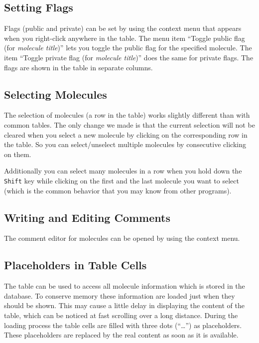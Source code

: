 \subsection{Setting Flags}

Flags (public and private) can be set by using the context menu that
appears when you right-click anywhere in the table. The menu item ``Toggle
public flag (for \textit{molecule title})'' lets you toggle the public
flag for the specified molecule. The item ``Toggle private flag
(for \textit{molecule title})'' does the same for private flags. The
flags are shown in the table in separate columns.


\subsection{Selecting Molecules}

The selection of molecules (a row in the table) works slightly different
than with common tables. The only change we made is that the current
selection will not be cleared when you select a new molecule by clicking
on the corresponding row in the table. So you can select/unselect
multiple molecules by consecutive clicking on them.

Additionally you can select many molecules in a row when you hold
down the \texttt{Shift} key while clicking on the first and the last
molecule you want to select (which is the common behavior that you
may know from other programs).


\subsection{Writing and Editing Comments}

The comment editor for molecules can be opened by using the context menu. 


\subsection{Placeholders in Table Cells}

The table can be used to access all molecule information which is
stored in the database. To conserve memory these information are loaded
just when they should be shown. This may cause a little delay in
displaying the content of the table, which can be noticed at fast
scrolling over a long distance. During the loading process the table cells
are filled with three dots ({}``\ldots{}'') as placeholders. These
placeholders are replaced by the real content as soon as it is available.
